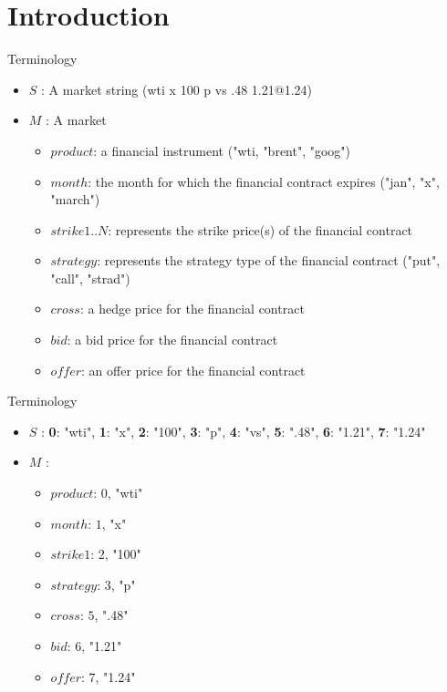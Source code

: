 \section{Introduction}
\begin{frame}{Terminology}
 \begin{itemize}
  \item $S$ : A market string (wti x 100 p vs .48 1.21@1.24)
  \pause
  \item $M$ : A market 
  \begin{itemize}
  	\item $product$: a financial instrument ("wti, "brent", "goog")
    \item $month$: the month for which the financial contract expires ("jan", "x", "march")
    \item $strike1..N$: represents the strike price(s) of the financial contract
    \item $strategy$: represents the strategy type of the financial contract ("put", "call", "strad")
    \item $cross$: a hedge price for the financial contract
    \item $bid$: a bid price for the financial contract
    \item $offer$: an offer price for the financial contract
  \end{itemize}
 \end{itemize}
\end{frame}


\begin{frame}{Terminology}
 \begin{itemize}
  \item $S$ : \newline\textbf{0}: "wti", \textbf{1}: "x", \textbf{2}: "100", \textbf{3}: "p", \textbf{4}: "vs", \textbf{5}: ".48", \textbf{6}: "1.21", \textbf{7}: "1.24"
  \item $M$ : 
  \begin{itemize}
  	\item $product$: $0$, "wti"
    \item $month$: $1$, "x"
    \item $strike1$: $2$, "100"
    \item $strategy$: $3$, "p"
    \item $cross$: $5$, ".48"
    \item $bid$: $6$, "1.21"
    \item $offer$: $7$, "1.24"
  \end{itemize}
 \end{itemize}
\end{frame}


